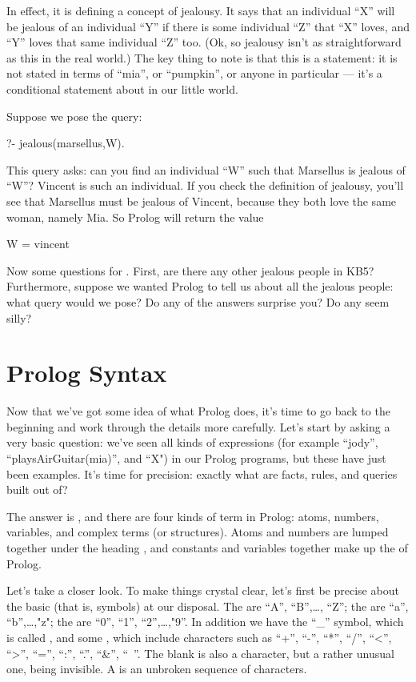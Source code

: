 In effect, it is defining a concept of jealousy.  It says that an
individual ``X'' will be jealous of an individual ``Y'' if there is some
individual ``Z'' that ``X'' loves, and ``Y'' loves that same individual ``Z''
too. (Ok, so jealousy isn't as straightforward as this in the real
world.) The key thing to note is that this is a 
statement: it is not stated in terms of ``mia'', or ``pumpkin'', or anyone
in particular --- it's a conditional statement about
 in our little world.

Suppose we pose the query:
%
\begin{LPNcodedisplay}
?- jealous(marsellus,W).
\end{LPNcodedisplay}
%
This query asks: can you find an individual ``W'' such that Marsellus is
jealous of ``W''?  Vincent is such an individual.  If you check the
definition of jealousy, you'll see that Marsellus must be jealous of
Vincent, because they both love the same woman, namely Mia. So Prolog
will return the value
%
\begin{LPNcodedisplay}
W = vincent
\end{LPNcodedisplay}


Now some questions for . First, are there any other
jealous people in KB5? Furthermore, suppose we wanted Prolog to tell
us about all the jealous people: what query would we pose? Do any of
the answers surprise you? Do any seem silly?



\section{Prolog Syntax}\label{SEC.L1.SYNTAX}

Now that we've got some idea of what Prolog does, it's time to go back
to the beginning and work through the details more carefully. Let's
start by asking a very basic question: we've seen all kinds of
expressions (for example ``jody'', ``playsAirGuitar(mia)'', and ``X") in
our Prolog programs, but these have just been examples.  It's time for
precision: exactly what are facts, rules, and queries built out of?

The answer is , and there are four kinds of term in
Prolog: atoms, numbers, variables, and complex terms (or structures).
Atoms and numbers are lumped together under the heading
, and constants and variables together make up the
 of Prolog.

Let's take a closer look. To make things crystal clear, let's first be
precise about the basic  (that is, symbols) at our
disposal.  The  are ``A'', ``B'',\ldots, ``Z'';
the  are ``a'', ``b'',\ldots,"z"; the
 are ``0'', ``1'', ``2'',\ldots,"9''. In addition we have the ``\_''
symbol, which is called , and some , which include characters such as ``+'', ``-'', ``*'', ``/'',
``<'', ``>'', ``='', ``:'', ``.'', ``\&'', ``~''.  The blank  is also
a character, but a rather unusual one, being invisible. A
 is an unbroken sequence of characters.



